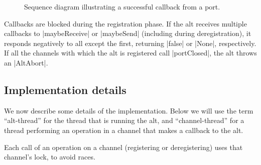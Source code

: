 \begin{figure}
\begin{center}
\def\height{7.5} %
\def\gap{3.5} %
\end{center}
\caption{Sequence diagram illustrating a successful callback from a
  port.  \label{fig:alt-2}}
\end{figure}


Callbacks are blocked during the registration phase.
If the alt receives multiple callbacks to |maybeReceive| or |maybeSend|
(including during deregistration), it responds negatively to all except the
first, returning |false| or |None|, respectively.
%
If all the channels with which the alt is registered call |portClosed|, the
alt throws an |AltAbort|. 


\subsection{Implementation details}

We now describe some details of the implementation.  Below we will use the
term ``alt-thread'' for the thread that is running the alt, and
``channel-thread'' for a thread performing an operation in a channel that
makes a callback to the alt. 

Each call of an operation on a channel (registering or deregistering) uses that
channel's lock, to avoid races.  

